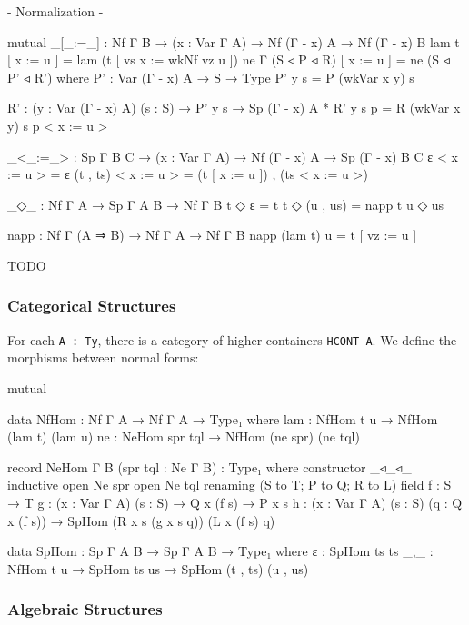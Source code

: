 \begin{code}[hide]
{- Normalization -}

mutual
  _[_:=_] : Nf Γ B → (x : Var Γ A) → Nf (Γ - x) A → Nf (Γ - x) B
  lam t [ x := u ] = lam (t [ vs x := wkNf vz u ])
  ne {Γ} (S ◃ P ◃ R) [ x := u ] = ne (S ◃ P' ◃ R')
    where
    P' : Var (Γ - x) A → S → Type
    P' y s = P (wkVar x y) s

    R' : (y : Var (Γ - x) A) (s : S) → P' y s → Sp (Γ - x) A *
    R' y s p = R (wkVar x y) s p < x := u >

  _<_:=_> : Sp Γ B C → (x : Var Γ A) → Nf (Γ - x) A → Sp (Γ - x) B C
  ε < x := u > = ε
  (t , ts) < x := u > = (t [ x := u ]) , (ts < x := u >)

  _◇_ : Nf Γ A → Sp Γ A B → Nf Γ B
  t ◇ ε = t
  t ◇ (u , us) = napp t u ◇ us
\end{code}

\begin{code}
  napp : Nf Γ (A ⇒ B) → Nf Γ A → Nf Γ B
  napp (lam t) u = t [ vz := u ]
\end{code}

TODO

\subsubsection*{Categorical Structures}

For each \texttt{A : Ty}, there is a category of higher containers \texttt{HCONT A}. We define the morphisms between normal forms:

\begin{code}[hide]
mutual
\end{code}

\begin{code}
  data NfHom : Nf Γ A → Nf Γ A → Type₁ where
    lam : NfHom t u → NfHom (lam t) (lam u)
    ne  : NeHom spr tql → NfHom (ne spr) (ne tql)

  record NeHom {Γ} {B} (spr tql : Ne Γ B) : Type₁ where
    constructor _◃_◃_
    inductive
    open Ne spr
    open Ne tql renaming (S to T; P to Q; R to L)
    field
      f : S → T
      g : (x : Var Γ A) (s : S) → Q x (f s) → P x s
      h : (x : Var Γ A) (s : S) (q : Q x (f s))
        → SpHom (R x s (g x s q)) (L x (f s) q)
        
  data SpHom : Sp Γ A B → Sp Γ A B → Type₁ where
    ε   : SpHom ts ts
    _,_ : NfHom t u → SpHom ts us → SpHom (t , ts) (u , us)
\end{code}

\subsubsection*{Algebraic Structures}

